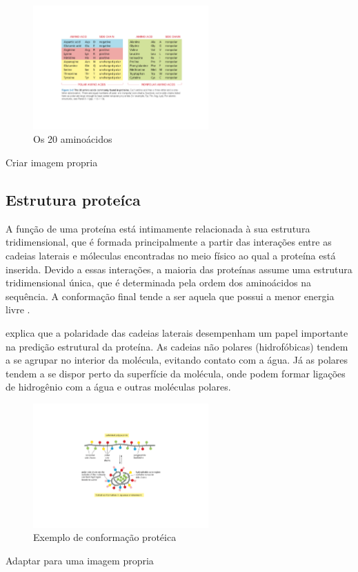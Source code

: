 \begin{figure}[H]
     \centering
     \includegraphics[width=0.6\textwidth]{figuras/20Aminoacidos.pdf}
     \caption{Os 20 aminoácidos \cite{Bio}}
\end{figure}
{\color{red} Criar imagem propria}

\subsection{Estrutura proteíca}

A função de uma proteína está intimamente relacionada à sua estrutura tridimensional, que é formada principalmente a partir das interações entre as cadeias laterais e móleculas encontradas no meio físico ao qual a proteína está inserida. Devido a essas interações, a maioria das proteínas assume uma estrutura tridimensional única, que é determinada pela ordem dos aminoácidos na sequência. A conformação final tende a ser aquela que possui a menor energia livre \cite{Bio}.

\cite{Bio} explica que a polaridade das cadeias laterais desempenham um papel importante na predição estrutural da proteína. As cadeias não polares (hidrofóbicas) tendem a se agrupar no interior da molécula, evitando contato com a água. Já as polares tendem a se dispor perto da superfície da molécula, onde podem formar ligações de hidrogênio com a água e outras moléculas polares. 

\begin{figure}[H]
     \centering
     \includegraphics[width=0.6\textwidth]{figuras/ConformacaoProteica.pdf}
     \caption{Exemplo de conformação protéica \cite{Bio}}
\end{figure}
{\color{red} Adaptar para uma imagem propria}

